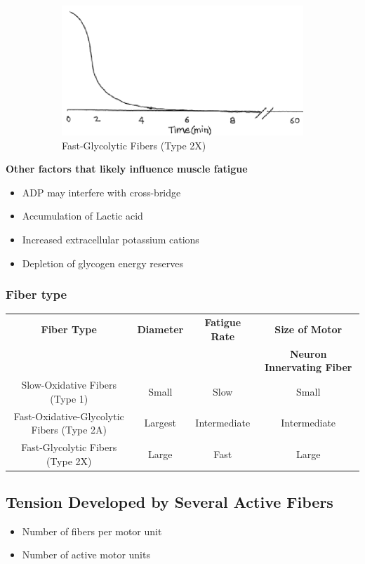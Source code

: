 \documentclass[11pt,fleqn]{book} %
\begin{document}
\begin{figure}[h!]
    \begin{subfigure}{0.45\textwidth}
        \includegraphics[width=\textwidth]{Pictures/Screenshot 2024-04-03 231449.png}
        \caption{Fast-Glycolytic Fibers
(Type 2X)}
    \end{subfigure}
    \caption{}
\end{figure}

\textbf{Other factors that likely influence muscle fatigue}
\begin{itemize}
    \item ADP may interfere with cross-bridge
    \item Accumulation of Lactic acid
    \item Increased extracellular potassium cations
    \item Depletion of glycogen energy reserves
\end{itemize}

\subsubsection{Fiber type}
\begin{tabular}{cccc}
\textbf{Fiber Type} &  \textbf{Diameter} & \textbf{Fatigue Rate} & \textbf{Size of Motor} \\
 & & & \textbf{Neuron Innervating Fiber}\\
\hline
Slow-Oxidative Fibers (Type 1) & Small & Slow & Small \\
Fast-Oxidative-Glycolytic Fibers (Type 2A)  & Largest & Intermediate & Intermediate  \\
Fast-Glycolytic Fibers (Type 2X)  & Large  & Fast  & Large \\
\end{tabular}


\subsection{Tension Developed by
Several Active Fibers}
\begin{itemize}
    \item Number of fibers per motor unit
    \item Number of active motor units
\end{itemize}
\end{document}
